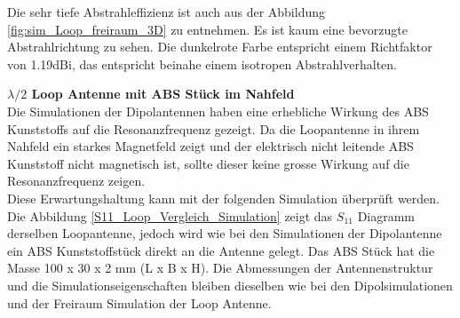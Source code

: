 Die sehr tiefe Abstrahleffizienz ist auch aus der Abbildung \ref{fig:sim_Loop_freiraum_3D} zu entnehmen. Es ist kaum eine bevorzugte Abstrahlrichtung zu sehen. Die dunkelrote Farbe entspricht einem Richtfaktor von 1.19dBi, das entspricht beinahe einem isotropen Abstrahlverhalten.

\textbf{$\lambda/2$ Loop Antenne mit ABS Stück im Nahfeld}\\
Die Simulationen der Dipolantennen haben eine erhebliche Wirkung des ABS Kunststoffs auf die Resonanzfrequenz gezeigt. Da die Loopantenne in ihrem Nahfeld ein starkes Magnetfeld zeigt und der elektrisch nicht leitende ABS Kunststoff nicht magnetisch ist, sollte dieser keine grosse Wirkung auf die Resonanzfrequenz zeigen.\\ Diese Erwartungshaltung kann mit der folgenden Simulation überprüft werden.\\
 
Die Abbildung \ref{S11_Loop_Vergleich_Simulation} zeigt das $S_{11}$ Diagramm derselben Loopantenne, jedoch wird wie bei den Simulationen der Dipolantenne ein ABS Kunststoffstück direkt an die Antenne gelegt. Das ABS Stück hat die Masse 100 x 30 x 2 mm (L x B x H). Die Abmessungen der Antennenstruktur und die Simulationseigenschaften bleiben dieselben wie bei den Dipolsimulationen und der Freiraum Simulation der Loop Antenne.\\

